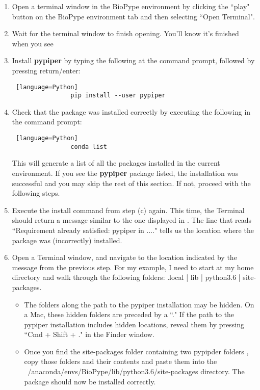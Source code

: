 \begin{enumerate}
        \begin{enumerate}
            \item Open a terminal window in the BioPype environment by clicking the ``play" button on the BioPype environment tab and then selecting ``Open Terminal".
            \item Wait for the terminal window to finish opening. You'll know it's finished when you see 
            \item Install \textbf{pypiper} by typing the following at the command prompt, followed by pressing return/enter:
            \begin{lstlisting} [language=Python]
                pip install --user pypiper
            \end{lstlisting}
            \item Check that the package was installed correctly by executing the following in the command prompt:
            \begin{lstlisting} [language=Python]
                conda list
            \end{lstlisting}
            This will generate a list of all the packages installed in the current environment. If you see the \textbf{pypiper} package listed, the installation was successful and you may skip the rest of this section. If not, proceed with the following steps.
            \item Execute the install command from step (c) again. This time, the Terminal should return a message similar to the one displayed in . The line that reads ``Requirement already satisfied: pypiper in ...." tells us the location where the package was (incorrectly) installed. 
            \item Open a Terminal window, and navigate to the location indicated by the message from the previous step. For my example, I need to start at my home directory and walk through the following folders: .local | lib | python3.6 | site-packages. 
            \begin{itemize}
                \item The folders along the path to the pypiper installation may be hidden. On a Mac, these hidden folders are preceded by a ``." If the path to the pypiper installation includes hidden locations, reveal them by pressing ``Cmd + Shift + ." in the Finder window.
            \item Once you find the site-packages folder containing two pypipder folders , copy those folders and their contents and paste them into the ~/anaconda/envs/BioPype/lib/python3.6/site-packages directory. The package should now be installed correctly.  
            \marginlabel{}
            \end{itemize}
        \end{enumerate}    
    \end{enumerate}

